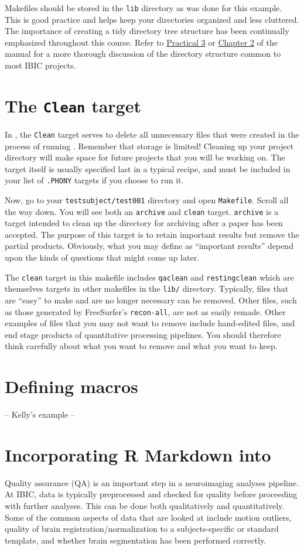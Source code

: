 Makefiles should be stored in the \texttt{lib} directory as was done for this example. This is good practice and helps keep your directories organized and less cluttered. The importance of creating a tidy directory tree structure has been continually emphasized throughout this course. Refer to \hyperref[sec:practicum3]{Practical 3} or \hyperref[sec:dir]{Chapter 2} of the manual for a more thorough discussion of the directory structure common to most IBIC projects.

\section{The \texttt{Clean} target}
In \maken{}, the \texttt{Clean} target serves to delete all unnecessary files that were created in the process of running \maken{}. Remember that storage is limited! Cleaning up your project directory will make space for future projects that you will be working on. The target itself is usually specified last in a typical \maken{} recipe, and must be included in your list of \texttt{.PHONY} targets if you choose to run it. 

Now, go to your \texttt{testsubject/test001} directory and open \texttt{Makefile}. Scroll all the way down. You will see both an \texttt{archive} and \texttt{clean} target. \texttt{archive} is a target intended to clean up the directory for archiving after a paper has been accepted. The purpose of this target is to retain important results but remove the partial products. Obviously, what you may define as ``important results'' depend upon the kinds of questions that might come up later. 

The \texttt{clean} target in this makefile includes \texttt{qaclean} and \texttt{restingclean} which are themselves targets in other makefiles in the \texttt{lib/} directory. Typically, files that are ``easy'' to make and are no longer necessary can be removed. Other files, such as those generated by FreeSurfer's \texttt{recon-all}, are not as easily remade. Other examples of files that you may not want to remove include hand-edited files, and end stage products of quantitative processing pipelines. You should therefore think carefully about what you want to remove and what you want to keep. 

\section{Defining macros}
-- Kelly's example --


\section{Incorporating R Markdown into \maken{}}
Quality assurance (QA) is an important step in a neuroimaging analyses pipeline. At IBIC, data is typically  preprocessed and checked for quality before proceeding with further analyses. This can be done both qualitatively and quantitatively. Some of the common aspects of data that are looked at include motion outliers, quality of brain registration/normalization to a subjects-specific or standard template, and whether brain segmentation has been performed correctly. 

